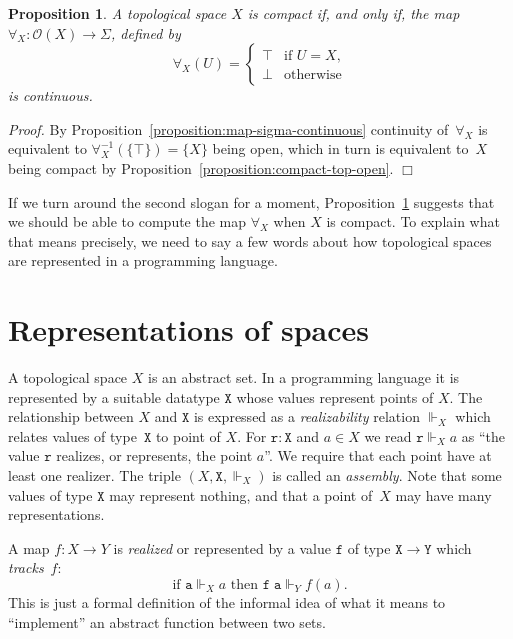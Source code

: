\documentclass[a4paper,10pt]{article}
\newtheorem{proposition}[theorem]{Proposition}
\newenvironment{proof}{\par\noindent\textit{Proof.}}{\hfill$\Box$\par\medskip}
\newcommand{\set}[1]{\{#1\}}
\newcommand{\tpl}[1]{\mathcal{O}(#1)}
\newcommand{\R}[1]{\mathtt{#1}}
\newcommand{\rz}{\Vdash}
\begin{document}
\begin{proposition}
  \label{proposition:compact-iff-forall-continuous}
  A topological space $X$ is compact if, and only if, the map $\forall_X :
  \tpl{X} \to \Sigma$, defined by
  \begin{equation*} \forall_X(U) =
    \begin{cases} \top & \text{if $U = X$,}\\ \bot & \text{otherwise}
    \end{cases}
  \end{equation*}
  is continuous.
\end{proposition}

\begin{proof} By Proposition~\ref{proposition:map-sigma-continuous} continuity
of~$\forall_X$ is equivalent to $\forall_X^{-1}(\set{\top}) = \set{X}$ being
open, which in turn is equivalent to~$X$ being compact by
Proposition~\ref{proposition:compact-top-open}.
\end{proof}

If we turn around the second slogan for a moment,
Proposition~\ref{proposition:compact-iff-forall-continuous} suggests that we
should be able to compute the map $\forall_X$ when $X$ is compact. To explain
what that means precisely, we need to say a few words about how topological
spaces are represented in a programming language.

\section{Representations of spaces}
\label{sec:representations}

A topological space $X$ is an abstract set. In a programming language
it is represented by a suitable datatype $\mathtt{X}$ whose values
represent points of $X$. The relationship between $X$ and $\mathtt{X}$
is expressed as a \emph{realizability} relation $\rz_X$ which relates
values of type~$\mathtt{X}$ to point of $X$. For $\R{r} : \mathtt{X}$
and $a \in X$ we read $\R{r} \rz_X a$ as ``the value $\R{r}$ realizes,
or represents, the point $a$''. We require that each point have at
least one realizer. The triple $(X, \mathtt{X}, {\rz_X})$ is called an
\emph{assembly}. Note that some values of type $\mathtt{X}$ may
represent nothing, and that a point of~$X$ may have many
representations.

A map $f : X \to Y$ is \emph{realized} or represented by a value $\R{f}$ of
type $\mathtt{X} \to \mathtt{Y}$ which \emph{tracks}~$f$:
% 
\begin{equation*}
  \text{if $\R{a} \rz_X a$ then $\R{f}\;\R{a} \rz_Y f(a)$.}
\end{equation*}
%
This is just a formal definition of the informal idea of what it means
to ``implement'' an abstract function between two sets.
 
\end{document}

